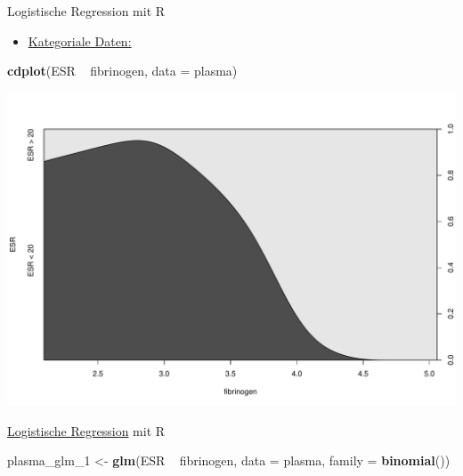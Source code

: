 \documentclass[ignorenonframetext,]{beamer}
\newenvironment{Shaded}{}{}
\newcommand{\KeywordTok}[1]{\textcolor[rgb]{0.00,0.44,0.13}{\textbf{{#1}}}}
\newcommand{\DataTypeTok}[1]{\textcolor[rgb]{0.56,0.13,0.00}{{#1}}}
\newcommand{\StringTok}[1]{\textcolor[rgb]{0.25,0.44,0.63}{{#1}}}
\newcommand{\NormalTok}[1]{{#1}}
\providecommand{\tightlist}{%
\setlength{\itemsep}{0pt}\setlength{\parskip}{0pt}}
\begin{document}
\begin{frame}[fragile]{Logistische Regression mit R}

\begin{itemize}
\tightlist
\item
  \href{http://homepage.univie.ac.at/herbert.nagel/KategorialeDaten.pdf}{Kategoriale
  Daten:}
\end{itemize}

\begin{Shaded}
\begin{Highlighting}[]
\KeywordTok{cdplot}\NormalTok{(ESR ~}\StringTok{ }\NormalTok{fibrinogen, }\DataTypeTok{data =} \NormalTok{plasma)}
\end{Highlighting}
\end{Shaded}

\includegraphics{R_intern_files/figure-beamer/unnamed-chunk-326-1.pdf}

\end{frame}

\begin{frame}[fragile]{\href{http://ww2.coastal.edu/kingw/statistics/R-tutorials/logistic.html}{Logistische
Regression} mit R}

\begin{Shaded}
\begin{Highlighting}[]
\NormalTok{plasma_glm_1 <-}\StringTok{ }\KeywordTok{glm}\NormalTok{(ESR ~}\StringTok{ }\NormalTok{fibrinogen, }\DataTypeTok{data =} \NormalTok{plasma, }
                    \DataTypeTok{family =} \KeywordTok{binomial}\NormalTok{())}
\end{Highlighting}
\end{Shaded}

\end{frame}
\end{document}
